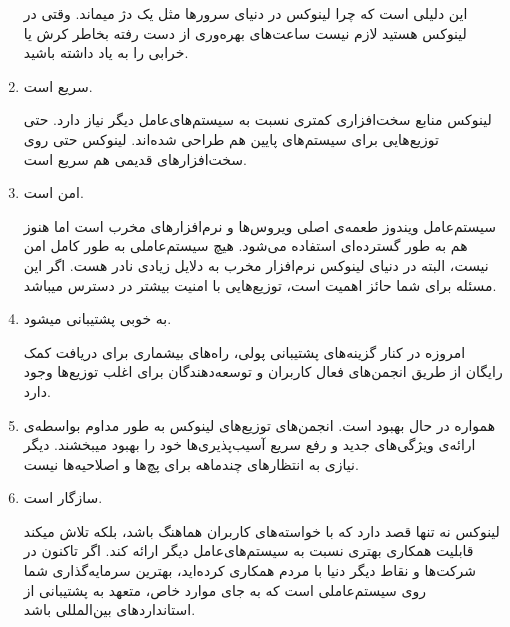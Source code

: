\begin{enumerate}
این دلیلی است که چرا لینوکس در دنیای سرورها مثل یک دژ میماند. وقتی در لینوکس هستید لازم نیست ساعت‌های بهره‌وری از دست رفته بخاطر کرش یا خرابی را به یاد داشته باشید.
\item  سریع است.

لینوکس منابع سخت‌افزاری کمتری نسبت به سیستم‌های‌عامل دیگر نیاز دارد. حتی توزیع‌هایی برای سیستم‌های پایین هم طراحی شده‌اند. لینوکس حتی روی سخت‌افزارهای قدیمی هم سریع است.
\item  امن است.

سیستم‌عامل ویندوز طعمه‌ی اصلی ویروس‌ها و نرم‌افزارهای مخرب است اما هنوز هم به طور گسترده‌ای استفاده می‌شود. هیچ سیستم‌عاملی به طور کامل امن نیست، البته در دنیای لینوکس نرم‌افزار مخرب به دلایل زیادی نادر هست. اگر این مسئله برای شما حائز اهمیت است، توزیع‌هایی با امنیت بیشتر در دسترس میباشد.
\item  به خوبی پشتیبانی میشود.

امروزه در کنار گزینه‌های پشتیبانی پولی، راه‌های بیشماری برای دریافت کمک رایگان از طریق انجمن‌های فعال کاربران و توسعه‌دهندگان برای اغلب توزیع‌ها وجود دارد.
\item  همواره در حال بهبود است.
انجمن‌های توزیع‌های لینوکس به طور مداوم بواسطه‌ی ارائه‌ی ویژگی‌های جدید و رفع سریع آسیب‌پذیری‌ها خود را بهبود میبخشند. دیگر نیازی به انتظارهای چندماهه برای پچ‌ها و اصلاحیه‌ها نیست.
\item  سازگار است.

لینوکس نه تنها قصد دارد که با خواسته‌های کاربران هماهنگ باشد، بلکه تلاش میکند قابلیت همکاری بهتری نسبت به سیستم‌های‌عامل دیگر ارائه کند. اگر تاکنون در شرکت‌ها و نقاط دیگر دنیا با مردم همکاری کرده‌اید، بهترین سرمایه‌گذاری شما روی سیستم‌عاملی است که به جای موارد خاص، متعهد به پشتیبانی از استانداردهای بین‌المللی باشد.
\end{enumerate}